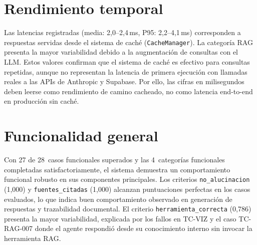 \section{Rendimiento temporal}

Las latencias registradas (media: 2,0--2,4\,ms, P95: 2,2--4,1\,ms) corresponden a respuestas servidas desde el sistema de caché (\texttt{CacheManager}). La categoría \ac{RAG} presenta la mayor variabilidad debido a la augmentación de consultas con el \ac{LLM}. Estos valores confirman que el sistema de caché es efectivo para consultas repetidas, aunque no representan la latencia de primera ejecución con llamadas reales a las APIs de Anthropic y Supabase. Por ello, las cifras en milisegundos deben leerse como rendimiento de camino cacheado, no como latencia end-to-end en producción sin caché.


\section{Funcionalidad general}

Con 27 de 28~casos funcionales superados y las 4~categorías funcionales completadas satisfactoriamente, el sistema demuestra un comportamiento funcional robusto en sus componentes principales. Los criterios \texttt{no\_alucinacion} (1,000) y \texttt{fuentes\_citadas} (1,000) alcanzan puntuaciones perfectas en los casos evaluados, lo que indica buen comportamiento observado en generación de respuestas y trazabilidad documental. El criterio \texttt{herramienta\_correcta} (0,786) presenta la mayor variabilidad, explicada por los fallos en TC-VIZ y el caso TC-RAG-007 donde el agente respondió desde su conocimiento interno sin invocar la herramienta \ac{RAG}.
